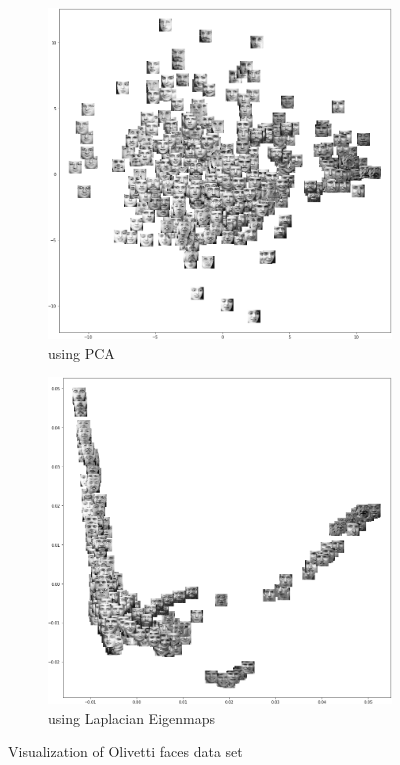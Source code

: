 \begin{figure}
	\centering
	\begin{subfigure}[h]{0.65\textwidth}
		\centering
		\includegraphics[width=\textwidth]{./figures/pca_1.png}
		\caption{using PCA}
	\end{subfigure}
	
	\begin{subfigure}[h]{0.65\textwidth}
		\centering
		\includegraphics[width=\textwidth]{./figures/lap_1.png}
		\caption{using Laplacian Eigenmaps}
	\end{subfigure}
	\caption{Visualization of Olivetti faces data set}
\end{figure}

